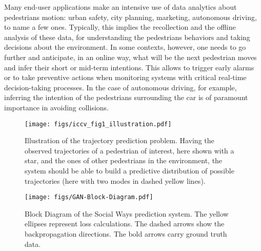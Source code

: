 \documentclass[10pt,twocolumn,letterpaper]{article}
\begin{document}
Many end-user applications make an intensive use of data analytics about pedestrians motion: urban safety, city planning, marketing, autonomous driving, to name a few ones. Typically, this implies the recollection and the offline analysis of these data, for understanding the pedestrians behaviors and taking decisions about the environment. In some contexts, however, one needs to go further and anticipate, in an online way, what will be the next pedestrian moves and infer their short or mid-term intentions. This allows to trigger early alarms or to take preventive actions when monitoring systems with critical real-time decision-taking processes. In the case of autonomous driving, for example, inferring the intention of the pedestrians surrounding the car is of paramount importance in avoiding collisions. 

\begin{figure}[t]
	\begin{center}
		\texttt{[image: figs/iccv\_fig1\_illustration.pdf]}
	\end{center}
	\caption{Illustration of the trajectory prediction problem. Having the observed trajectories of a pedestrian of interest, here shown with a star, and the ones of other pedestrians in the environment, the system should be able to build a predictive distribution of possible trajectories (here with two modes in dashed yellow lines).}
	\label{fig:figOverview}
	\vspace{-0.35cm}
\end{figure}
\begin{figure*}[!ht]
	\begin{center}
		\texttt{[image: figs/GAN-Block-Diagram.pdf]}
	\end{center}
	\caption{Block Diagram of the Social Ways prediction system. The yellow ellipses represent loss calculations. The dashed arrows show the backpropagation directions. The bold arrows carry ground truth data.}
	\label{fig:blcok_diagram}
	\vspace{-0.2cm}
\end{figure*}
\end{document}
